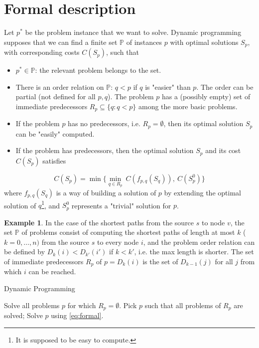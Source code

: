 \documentclass[11pt, openany]{report}
\theoremstyle{definition}
\newtheorem{ex}[thm]{Example}
\begin{document}
\section{Formal description}
Let $p^*$ be the problem instance that we want to solve. Dynamic programming supposes that we can find a finite set $\mathbb{P}$ of instances $p$ with optimal solutions $S_p$, with corresponding costs $C(S_p)$, such that 
\begin{itemize}
    \item $p^*\in \mathbb{P}$: the relevant problem belongs to the set.
    \item There is an order relation on $\mathbb{P}$: $q<p$ if $q$ is "easier" than $p$. The order can be partial (not defined for all $p,q$). The problem $p$ has a (possibly empty) set of immediate predecessors $R_p\subseteq \{q:q<p\}$ among the more basic problems.
    \item If the problem $p$ has no predecessors, i.e. $R_p=\emptyset$, then its optimal solution $S_p$ can be "easily" computed. 
    \item If the problem has predecessors, then the optimal solution $S_p$ and its cost $C(S_p)$ satisfies
\end{itemize}
\begin{equation}\label{eq:formal}
    C(S_p)=\min\{\min_{q\in R_p}\:C(f_{p,q}(S_q)),\:C(S_p^0)\}
\end{equation}
where $f_{p,q}(S_q)$ is a way of building a solution of $p$ by extending the optimal solution of $q$\footnote{It is supposed to be easy to compute.}, and $S_p^0$ represents a "trivial" solution for $p$. 
\begin{ex}
    In the case of the shortest paths from the source $s$ to node $v$, the set $\mathbb{P}$ of problems consist of computing the shortest paths of length at most $k$ ($k=0,\dots,n)$ from the source $s$ to every node $i$, and the problem order relation can be defined by $D_k(i)<D_{k'}(i')$ if $k<k'$, i.e. the max length is shorter. The set of immediate predecessors $R_p$ of $p=D_k(i)$ is the set of $D_{k-1}(j)$ for all $j$ from which $i$ can be reached. 
\end{ex}
\begin{algorithm}
    \caption{Dynamic Programming}\label{algo:dp}
    \begin{algorithmic}[1]
        \State Solve all problems $p$ for which $R_p=\emptyset$.
            \State Pick $p$ such that all problems of $R_p$ are solved;
            \State Solve $p$ using \eqref{eq:formal}.
        \EndWhile
    \end{algorithmic}
\end{algorithm}
\end{document}
